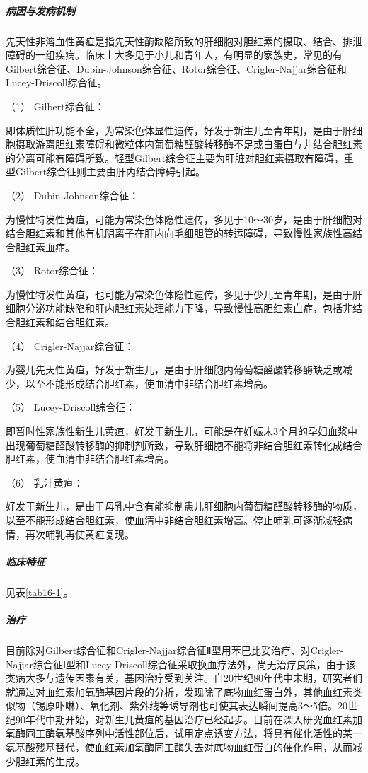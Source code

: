 \subparagraph{病因与发病机制}

先天性非溶血性黄疸是指先天性酶缺陷所致的肝细胞对胆红素的摄取、结合、排泄障碍的一组疾病。临床上大多见于小儿和青年人，有明显的家族史，常见的有Gilbert综合征、Dubin-Johnson综合征、Rotor综合征、Crigler-Najjar综合征和Lucey-Driscoll综合征。

\hypertarget{text00039.htmlux5cux23CHP1-16-4-2-1-1}{}
（1） Gilbert综合征：

即体质性肝功能不全，为常染色体显性遗传，好发于新生儿至青年期，是由于肝细胞摄取游离胆红素障碍和微粒体内葡萄糖醛酸转移酶不足或白蛋白与非结合胆红素的分离可能有障碍所致。轻型Gilbert综合征主要为肝脏对胆红素摄取有障碍，重型Gilbert综合征则主要由肝内结合障碍引起。

\hypertarget{text00039.htmlux5cux23CHP1-16-4-2-1-2}{}
（2） Dubin-Johnson综合征：

为慢性特发性黄疸，可能为常染色体隐性遗传，多见于10～30岁，是由于肝细胞对结合胆红素和其他有机阴离子在肝内向毛细胆管的转运障碍，导致慢性家族性高结合胆红素血症。

\hypertarget{text00039.htmlux5cux23CHP1-16-4-2-1-3}{}
（3） Rotor综合征：

为慢性特发性黄疸，也可能为常染色体隐性遗传，多见于少儿至青年期，是由于肝细胞分泌功能缺陷和肝内胆红素处理能力下降，导致慢性高胆红素血症，包括非结合胆红素和结合胆红素。

\hypertarget{text00039.htmlux5cux23CHP1-16-4-2-1-4}{}
（4） Crigler-Najjar综合征：

为婴儿先天性黄疸，好发于新生儿，是由于肝细胞内葡萄糖醛酸转移酶缺乏或减少，以至不能形成结合胆红素，使血清中非结合胆红素增高。

\hypertarget{text00039.htmlux5cux23CHP1-16-4-2-1-5}{}
（5） Lucey-Driscoll综合征：

即暂时性家族性新生儿黄疸，好发于新生儿，可能是在妊娠末3个月的孕妇血浆中出现葡萄糖醛酸转移酶的抑制剂所致，导致肝细胞不能将非结合胆红素转化成结合胆红素，使血清中非结合胆红素增高。

\hypertarget{text00039.htmlux5cux23CHP1-16-4-2-1-6}{}
（6） 乳汁黄疸：

好发于新生儿，是由于母乳中含有能抑制患儿肝细胞内葡萄糖醛酸转移酶的物质，以至不能形成结合胆红素，使血清中非结合胆红素增高。停止哺乳可逐渐减轻病情，再次哺乳再使黄疸复现。

\subparagraph{临床特征}

见表\ref{tab16-1}。

\subparagraph{治疗}

目前除对Gilbert综合征和Crigler-Najjar综合征Ⅱ型用苯巴比妥治疗、对Crigler-Najjar综合征Ⅰ型和Lucey-Driscoll综合征采取换血疗法外，尚无治疗良策，由于该类病大多与遗传因素有关，基因治疗受到关注。自20世纪80年代中末期，研究者们就通过对血红素加氧酶基因片段的分析，发现除了底物血红蛋白外，其他血红素类似物（锡原卟啉）、氧化剂、紫外线等诱导剂也可使其表达瞬间提高3～5倍。20世纪90年代中期开始，对新生儿黄疸的基因治疗已经起步。目前在深入研究血红素加氧酶同工酶氨基酸序列中活性部位后，试用定点诱变方法，将具有催化活性的某一氨基酸残基替代，使血红素加氧酶同工酶失去对底物血红蛋白的催化作用，从而减少胆红素的生成。

